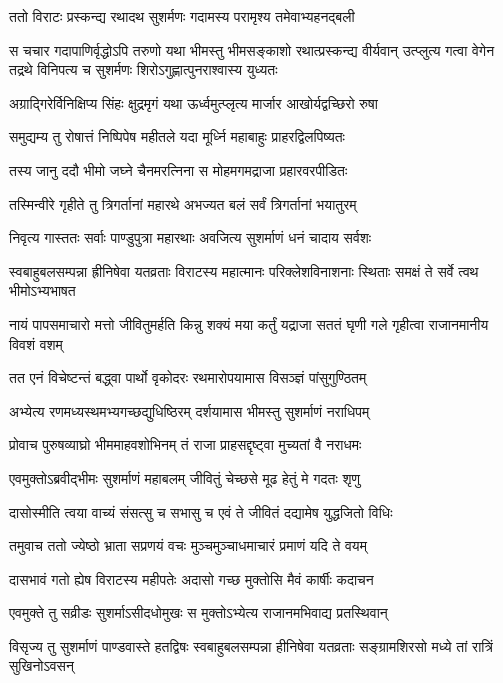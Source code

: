 \twolineshloka
{ततो विराटः प्रस्कन्द्य रथादथ सुशर्मणः}
{गदामस्य परामृश्य तमेवाभ्यहनद्बली}


\onelineshloka
{स चचार गदापाणिर्वृद्धोऽपि तरुणो यथा}
\threelineshloka
{भीमस्तु भीमसङ्काशो रथात्प्रस्कन्द्य वीर्यवान्}
{उत्प्लुत्य गत्वा वेगेन तद्रथे विनिपत्य च}
{सुशर्मणः शिरोऽगुह्णात्पुनराश्वास्य युध्यतः}


\twolineshloka
{अग्राद्गिरेर्विनिक्षिप्य सिंहः क्षुद्रमृगं यथा}
{ऊर्ध्वमुत्प्लृत्य मार्जार आखोर्यद्वच्छिरो रुषा}


\twolineshloka
{समुद्यम्य तु रोषात्तं निष्पिपेष महीतले}
{यदा मूर्ध्नि महाबाहुः प्राहरद्विलपिष्यतः}


\twolineshloka
{तस्य जानु ददौ भीमो जघ्ने चैनमरत्निना}
{स मोहमगमद्राजा प्रहारवरपीडितः}


\twolineshloka
{तस्मिन्वीरे गृहीते तु त्रिगर्तानां महारथे}
{अभज्यत बलं सर्वं त्रिगर्तानां भयातुरम्}


\twolineshloka
{निवृत्य गास्ततः सर्वाः पाण्डुपुत्रा महारथाः}
{अवजित्य सुशर्माणं धनं चादाय सर्वशः}


\threelineshloka
{स्वबाहुबलसम्पन्ना ह्रीनिषेवा यतव्रताः}
{विराटस्य महात्मानः परिक्लेशविनाशनाः}
{स्थिताः समक्षं ते सर्वे त्वथ भीमोऽभ्यभाषत}


\threelineshloka
{नायं पापसमाचारो मत्तो जीवितुमर्हति}
{किन्नु शक्यं मया कर्तुं यद्राजा सततं घृणी}
{गले गृहीत्वा राजानमानीय विवशं वशम्}


\twolineshloka
{तत एनं विचेष्टन्तं बद्ध्वा पार्थो वृकोदरः}
{रथमारोपयामास विसञ्ज्ञं पांसुगुण्ठितम्}


\twolineshloka
{अभ्येत्य रणमध्यस्थमभ्यगच्छद्युधिष्ठिरम्}
{दर्शयामास भीमस्तु सुशर्माणं नराधिपम्}


\twolineshloka
{प्रोवाच पुरुषव्याघ्रो भीममाहवशोभिनम्}
{तं राजा प्राहसद्दृष्ट्वा मुच्यतां वै नराधमः}


\twolineshloka
{एवमुक्तोऽब्रवीद्भीमः सुशर्माणं महाबलम्}
{जीवितुं चेच्छसे मूढ हेतुं मे गदतः शृणु}


\twolineshloka
{दासोस्मीति त्वया वाच्यं संसत्सु च सभासु च}
{एवं ते जीवितं दद्यामेष युद्धजितो विधिः}


\twolineshloka
{तमुवाच ततो ज्येष्ठो भ्राता सप्रणयं वचः}
{मुञ्चमुञ्चाधमाचारं प्रमाणं यदि ते वयम्}


\twolineshloka
{दासभावं गतो ह्येष विराटस्य महीपतेः}
{अदासो गच्छ मुक्तोसि मैवं कार्षीः कदाचन}


\twolineshloka
{एवमुक्ते तु सव्रीडः सुशर्माऽसीदधोमुखः}
{स मुक्तोऽभ्येत्य राजानमभिवाद्य प्रतस्थिवान्}


\threelineshloka
{विसृज्य तु सुशर्माणं पाण्डवास्ते हतद्विषः}
{स्वबाहुबलसम्पन्ना हीनिषेवा यतव्रताः}
{सङ्ग्रामशिरसो मध्ये तां रात्रिं सुखिनोऽवसन्}

